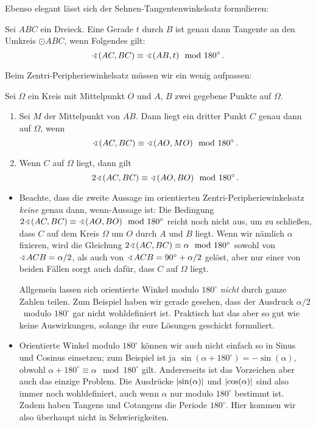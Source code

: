 Ebenso elegant lässt sich der Sehnen-Tangentenwinkelsatz formulieren:
\begin{satzmitnamen}
	Sei $ABC$ ein Dreieck. Eine Gerade $t$ durch $B$ ist genau dann Tangente an den Umkreis $\odot ABC$, wenn Folgendes gilt:
	\begin{equation*}
		\winkel(AC,BC)\equiv\winkel(AB,t) \mod 180^\circ\,.
	\end{equation*}
\end{satzmitnamen}
Beim Zentri-Peripheriewinkelsatz müssen wir ein wenig aufpassen:
\begin{satzmitnamen}\label{prop:ZPWS}
	Sei $\Omega$ ein Kreis mit Mittelpunkt $O$ und $A$, $B$ zwei gegebene Punkte auf $\Omega$.
	\begin{enumerate}
		\item Sei $M$ der Mittelpunkt von $\overline{AB}$. Dann liegt ein dritter Punkt $C$ genau dann auf $\Omega$, wenn
		\begin{equation*}
			\winkel(AC,BC)\equiv \winkel(AO,MO)\mod 180^\circ\,.
		\end{equation*}
		\item Wenn $C$ auf $\Omega$ liegt, dann gilt
		\begin{equation*}
			2\winkel(AC,BC)\equiv \winkel(AO,BO)\mod 180^\circ\,.
		\end{equation*}
	\end{enumerate}
\end{satzmitnamen}
\begin{itemize}
	\item[\Warnung] Beachte, dass die zweite Aussage im orientierten Zentri-Peripheriewinkelsatz \emph{keine} \glqq genau dann, wenn\grqq-Aussage ist: Die Bedingung $2\winkel(AC,BC)\equiv \winkel(AO,BO)\mod 180^\circ$ reicht noch nicht aus, um zu schließen, dass $C$ auf dem Kreis $\Omega$ um $O$ durch $A$ und $B$ liegt. Wenn wir nämlich $\alpha$ fixieren, wird die Gleichung $2\winkel(AC,BC)\equiv \alpha\mod180^\circ$ sowohl von $\winkel ACB=\alpha/2$, als auch von $\winkel ACB=90^\circ+\alpha/2$ gelöst, aber nur einer von beiden Fällen sorgt auch dafür, dass $C$ auf $\Omega$ liegt.
	
	Allgemein lassen sich orientierte Winkel modulo $180^\circ$ \emph{nicht} durch ganze Zahlen teilen. Zum Beispiel haben wir gerade gesehen, dass der Ausdruck \glqq$\alpha/2$\grqq\ modulo $180^\circ$ gar nicht wohldefiniert ist. Praktisch hat das aber so gut wie keine Auswirkungen, solange ihr eure Lösungen geschickt formuliert.
	\item[\Warnung] Orientierte Winkel modulo $180^\circ$ können wir auch nicht einfach so in Sinus und Cosinus einsetzen; zum Beispiel ist ja $\sin(\alpha + 180^\circ)=-\sin(\alpha)$, obwohl $\alpha + 180^\circ\equiv \alpha\mod180^\circ$ gilt. Andererseits ist das Vorzeichen aber auch das einzige Problem. Die Ausdrücke $\lvert\sin (\alpha)\rvert$ und $\lvert\cos(\alpha)\rvert$ sind also immer noch wohldefiniert, auch wenn $\alpha$ nur modulo $180^\circ$ bestimmt ist. Zudem haben Tangens und Cotangens die Periode $180^\circ$. Hier kommen wir also überhaupt nicht in Schwierigkeiten.
\end{itemize}
